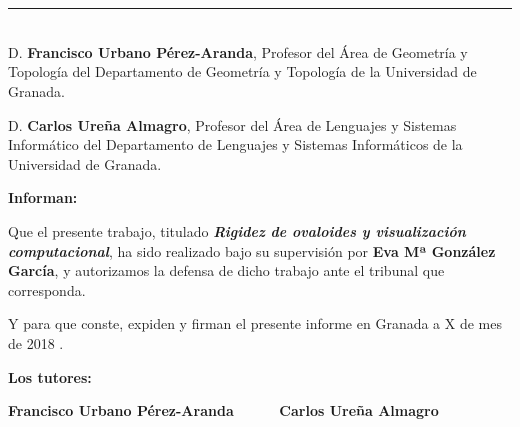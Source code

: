 \chapter*{}
\thispagestyle{empty}

\noindent\rule[-1ex]{\textwidth}{2pt}\\[4.5ex]

D. \textbf{Francisco Urbano Pérez-Aranda}, Profesor del Área de Geometría y Topología del Departamento de Geometría y Topología de la Universidad de Granada.

\vspace{0.5cm}

D. \textbf{Carlos Ureña Almagro}, Profesor del Área de Lenguajes y Sistemas Informático del Departamento de Lenguajes y Sistemas Informáticos de la Universidad de Granada.


\vspace{0.5cm}

\textbf{Informan:}

\vspace{0.5cm}

Que el presente trabajo, titulado \textit{\textbf{Rigidez de ovaloides y visualización computacional}},
ha sido realizado bajo su supervisión por \textbf{Eva Mª González García}, y autorizamos la defensa de dicho trabajo ante el tribunal que corresponda.

\vspace{0.5cm}

Y para que conste, expiden y firman el presente informe en Granada a X de mes de 2018 .

\vspace{1cm}

\textbf{Los tutores:}

\vspace{5cm}

\noindent \textbf{Francisco Urbano Pérez-Aranda \ \ \ \ \ Carlos Ureña Almagro}





